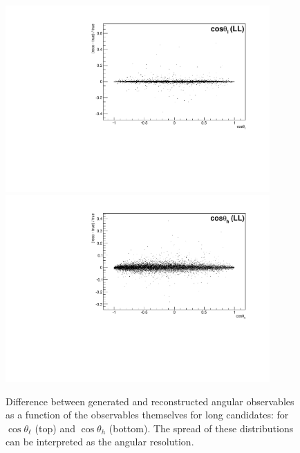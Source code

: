 \begin{table}[b]
\centering
\caption{Average angular resolutions for downstream and long candidates.} %
\label{tab:resolutions}
\end{table}
%
\begin{figure}
\centering
\includegraphics[width=0.9\textwidth]{Lmumu/figs/resolution/RmT_vs_cosThetaL_LL.pdf}
\includegraphics[width=0.9\textwidth]{Lmumu/figs/resolution/RmT_vs_cosThetaB_LL.pdf}
 \caption{Difference between generated and reconstructed angular observables as a function of the 
 observables themselves for long candidates: for $\cos\theta_\ell$ (top) and $\cos\theta_h$ (bottom). 
 The spread of these distributions can be interpreted as the angular resolution.
 }
\label{fig:resolutionvsq2ang}
\end{figure}
